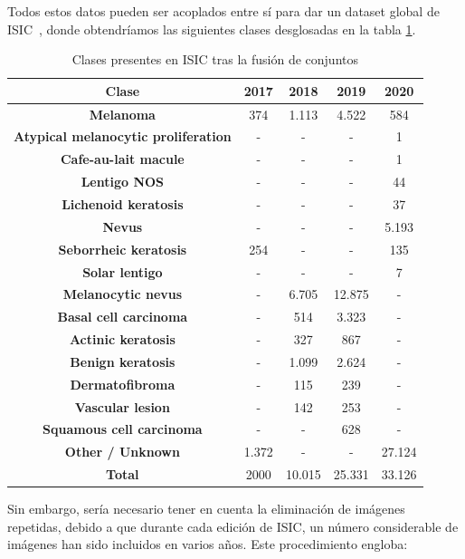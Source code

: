 Todos estos datos pueden ser acoplados entre sí para dar un dataset global de ISIC~\cite{CASSIDY2022102305}, donde obtendríamos las siguientes clases desglosadas en la tabla \ref{tab:isicclases}.


\begin{table}[H]
	\centering
	\begin{tabular}{|c|c|c|c|c|}
		\hline
		\textbf{Clase} & \textbf{2017} & \textbf{2018} & \textbf{2019} & \textbf{2020} \\ \hline
		\textbf{Melanoma} & 374 & 1.113 & 4.522 & 584 \\ \hline
		\textbf{Atypical melanocytic proliferation} & - & - & - & 1 \\ \hline
		\textbf{Cafe-au-lait macule} & - & - & - & 1 \\ \hline
		\textbf{Lentigo NOS} & - & - & - & 44 \\ \hline
		\textbf{Lichenoid keratosis} & - & - & - & 37 \\ \hline
		\textbf{Nevus} & - & - & - & 5.193 \\ \hline
		\textbf{Seborrheic keratosis} & 254 & - & - & 135 \\ \hline
		\textbf{Solar lentigo} & - & - & - & 7 \\ \hline
		\textbf{Melanocytic nevus} & - & 6.705 & 12.875 & - \\ \hline
		\textbf{Basal cell carcinoma} & - & 514 & 3.323 & - \\ \hline
		\textbf{Actinic keratosis} & - & 327 & 867 & - \\ \hline
		\textbf{Benign keratosis} & - & 1.099 & 2.624 & - \\ \hline
		\textbf{Dermatofibroma} & - & 115 & 239 & - \\ \hline
		\textbf{Vascular lesion} & - & 142 & 253 & - \\ \hline
		\textbf{Squamous cell carcinoma} & - & - & 628 & - \\ \hline
		\textbf{Other / Unknown} & 1.372 & - & - & 27.124 \\ \hline
		\textbf{Total} & 2000 & 10.015 & 25.331 & 33.126 \\ \hline
	\end{tabular}
	\caption{Clases presentes en ISIC tras la fusión de conjuntos}
	\label{tab:isicclases}
\end{table}

Sin embargo, sería necesario tener en cuenta la eliminación de imágenes repetidas, debido a que durante cada edición de ISIC, un número considerable de imágenes han sido incluidos en varios años. Este procedimiento engloba:

